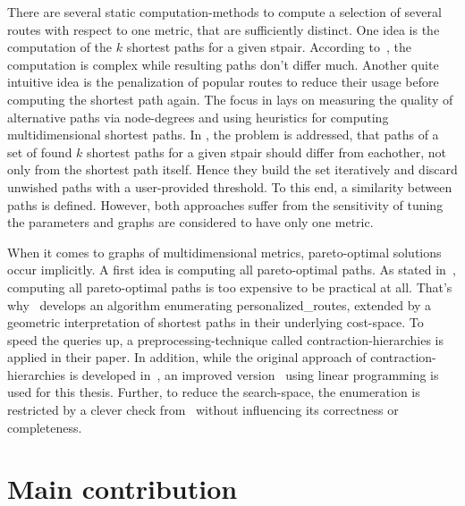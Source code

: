         There are several static computation-methods to compute a selection of several routes with respect to one \gls{metric}, that are sufficiently distinct.
        One idea is the computation of the $k$ shortest paths for a given \gls{stpair}.
        According to~\cite{eppstein:finding_k_shortest_paths}, the computation is complex while resulting paths don't differ much.
        Another quite intuitive idea is the penalization of popular routes to reduce their usage before computing the shortest path again.
        The focus in \cite{bader:alternative-route-graphs} lays on measuring the quality of alternative paths via node-degrees and using heuristics for computing multidimensional shortest paths.
        In \cite{chondrogiannis:k_shortest_paths}, the problem is addressed, that paths of a set of found $k$ shortest paths for a given \gls{stpair} should differ from eachother, not only from the shortest path itself.
        Hence they build the set iteratively and discard unwished paths with a user-provided threshold.
        To this end, a similarity between paths is defined.
        However, both approaches suffer from the sensitivity of tuning the parameters and graphs are considered to have only one \gls{metric}.

        When it comes to graphs of multidimensional \glspl{metric}, pareto-optimal solutions occur implicitly.
        A first idea is computing all pareto-optimal paths.
        As stated in~\cite{delling:pareto-paths}, computing all pareto-optimal paths is too expensive to be practical at all.
        That's why~\cite{barth:alternative_multicriteria_routes} develops an algorithm enumerating \glspl{personalized_route}, extended by a geometric interpretation of shortest paths in their underlying \gls{cost}-space.
        To speed the queries up, a preprocessing-technique called \gls{contraction-hierarchies} is applied in their paper.
        In addition, while the original approach of contraction-hierarchies is developed in~\cite{geisberger:contraction_hierarchies}, an improved version~\cite{funke:personal-routes} using linear programming is used for this thesis.
        Further, to reduce the search-space, the enumeration is restricted by a clever check from~\cite{barth:alternative_routes} without influencing its correctness or completeness.

\section{Main contribution}

